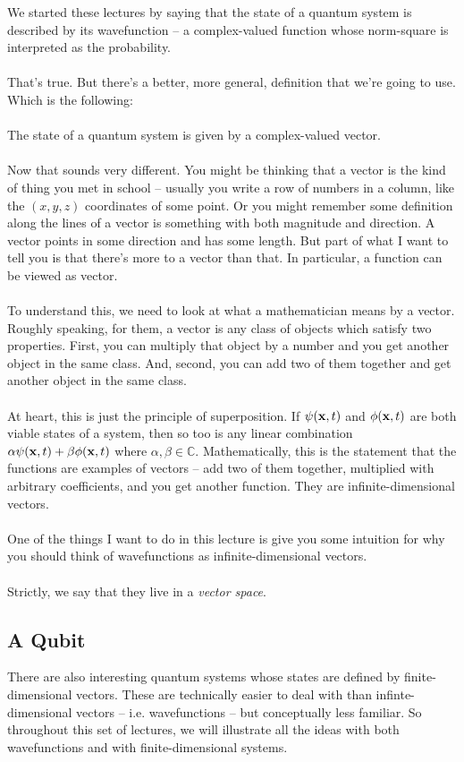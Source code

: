 \documentclass[12pt]{article}
\newcommand\para{\paragraph{}}
\newcommand{\co}{\color{olive}}
\newcommand{\bx}{{\bf x}}
\begin{document}
We started these lectures by saying that the state of a quantum system is described by its wavefunction -- a complex-valued function whose norm-square is interpreted as the probability.

\para
That's true. But there's a better, more general, definition that we're going to use. Which is the following:

\para
{\co The state of a quantum system is given by a complex-valued vector.}

\para
Now that sounds very different. You might be thinking that a vector is the kind of thing you met in school  -- usually you write a row of numbers in a column, like the $(x,y,z)$ coordinates of some point. Or you might remember some definition along the lines of a vector is something with both magnitude and direction. A vector points in some direction and has some length. But part of what I want to tell you is that there's more to a vector than that. In particular, a function can be viewed as  vector.

\para
To understand this, we need to look at what a mathematician means by a vector. Roughly speaking, for them, a vector is any class of objects which satisfy two properties. First, you can multiply that object by a number and you get another object in the same class. And, second, you can add two of them together and get another object in the same class. 

\para
{\co At heart, this is just the principle of superposition. If $\psi(\bx,t)$ and $\phi(\bx,t)$ are both viable states of a system, then so too is any linear combination $\alpha \psi(\bx,t) + \beta\phi(\bx,t)$ where  $\alpha, \beta\in \mathds{C}$. Mathematically, this is the statement that the functions are examples of vectors -- add two of them together, multiplied with arbitrary coefficients,  and you get another function. They are infinite-dimensional vectors}.

\para
One of the things I want to do in this lecture is give you some intuition for why you should think of wavefunctions as infinite-dimensional vectors. 

\para
{\co Strictly, we say that they live in a {\it vector space}.}



\subsection{A Qubit}

There are also interesting quantum systems whose states are defined by finite-dimensional vectors. These are technically easier to deal with than infinte-dimensional vectors -- i.e. wavefunctions -- but conceptually less familiar. So throughout this set of lectures,  we will illustrate all the ideas with both wavefunctions and with finite-dimensional systems.
\end{document}
